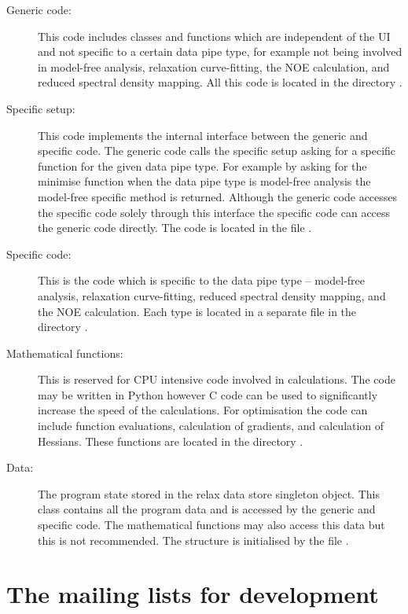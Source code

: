 \begin{description}
\item[Generic code:]  This code includes classes and functions which are independent of the UI and not specific to a certain data pipe type, for example not being involved in model-free analysis, relaxation curve-fitting, the NOE calculation, and reduced spectral density mapping.  All this code is located in the directory .

\item[Specific setup:]  This code implements the internal interface between the generic and specific code.  The generic code calls the specific setup asking for a specific function for the given data pipe type.  For example by asking for the minimise function when the data pipe type is model-free analysis the model-free specific  method is returned.  Although the generic code accesses the specific code solely through this interface the specific code can access the generic code directly.  The code is located in the file .

\item[Specific code:]  This is the code which is specific to the data pipe type -- model-free analysis, relaxation curve-fitting, reduced spectral density mapping, and the NOE calculation.  Each type is located in a separate file in the directory .

\item[Mathematical functions:]  This is reserved for CPU intensive code involved in calculations.  The code may be written in Python however C code can be used to significantly increase the speed of the calculations.  For optimisation the code can include function evaluations, calculation of gradients, and calculation of Hessians.  These functions are located in the directory .

\item[Data:]  The program state stored in the relax data store singleton object.  This class contains all the program data and is accessed by the generic and specific code.  The mathematical functions may also access this data but this is not recommended.  The structure is initialised by the file .
\end{description}





\section{The mailing lists for development}


